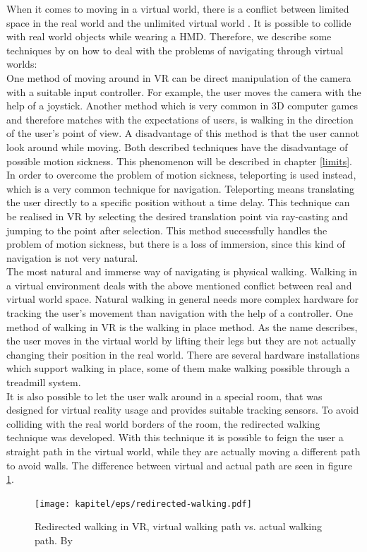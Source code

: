 When it comes to moving in a virtual world, there is a conflict between limited space in the real world and the unlimited virtual world \cite{Sherman.2019}. It is possible to collide with real world objects while wearing a HMD. Therefore, we describe some techniques by \cite{Dorner.2013} on how to deal with the problems of navigating through virtual worlds:\\
One method of moving around in VR can be direct manipulation of the camera with a suitable input controller. For example, the user moves the camera with the help of a joystick. Another method which is very common in 3D computer games and therefore matches with the expectations of users, is walking in the direction of the user's point of view. A disadvantage of this method is that the user cannot look around while moving. Both described techniques have the disadvantage of possible motion sickness. This phenomenon will be described in chapter \ref{limits}.\\
In order to overcome the problem of motion sickness, teleporting is used instead, which is a very common technique for navigation. Teleporting means translating the user directly to a specific position without a time delay. This technique can be realised in VR by selecting the desired translation point via ray-casting and jumping to the point after selection. This method successfully handles the problem of motion sickness, but there is a loss of immersion, since this kind of navigation is not very natural.  \cite{Bozgeyikli.2016}\\
The most natural and immerse way of navigating is physical walking. Walking in a virtual environment deals with the above mentioned conflict between real and virtual world space. Natural walking in general needs more complex hardware for tracking the user's movement than navigation with the help of a controller. One method of walking in VR is the walking in place method. As the name describes, the user moves in the virtual world by lifting their legs but they are not actually changing their position in the real world. There are several hardware installations which support walking in place, some of them make walking possible through a treadmill system.\\
It is also possible to let the user walk around in a special room, that was designed for virtual reality usage and provides suitable tracking sensors. To avoid colliding with the real world borders of the room, the redirected walking technique was developed. With this technique it is possible to feign the user a straight path in the virtual world, while they are actually moving a different path to avoid walls. The difference between virtual and actual path are seen in figure \ref{fig:walking}.
\begin{figure}[h!]
  \texttt{[image: kapitel/eps/redirected-walking.pdf]}
  \centering
  \caption{Redirected walking in VR, virtual walking path vs. actual walking path. By \cite{LS18}}
  \label{fig:walking}
\end{figure}

